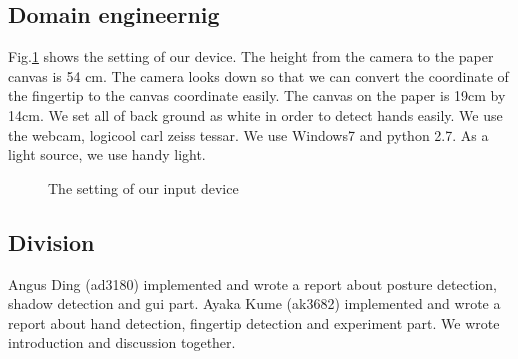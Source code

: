 \subsection{Domain engineernig}
Fig.\ref{fig:1} shows the setting of our device. The height from the camera to the paper canvas is 54 cm. The camera looks down so that we can convert the coordinate of the fingertip to the canvas coordinate easily. The canvas on the paper is 19cm by 14cm. We set all of back ground as white in order to detect hands easily. We use the webcam, logicool carl zeiss tessar. We use Windows7 and python 2.7. As a light source, we use handy light.
\begin{figure}
 \caption{The setting of our input device}
 \label{fig:1}
\end{figure}
\subsection{Division}
Angus Ding (ad3180) implemented and wrote a report about posture detection, shadow detection and gui part.
Ayaka Kume (ak3682) implemented and wrote a report about hand detection, fingertip detection and experiment part.
We wrote introduction and discussion together.
